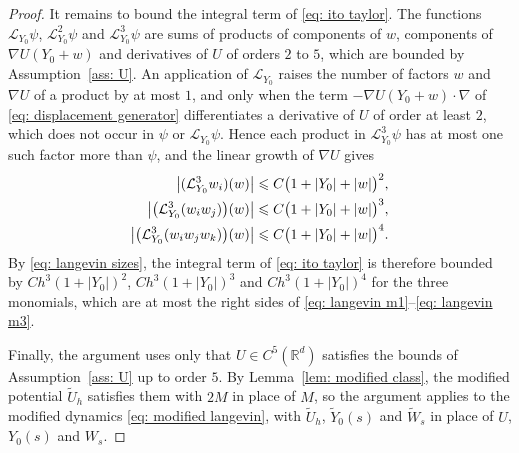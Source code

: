 \begin{proof}
    It remains to bound the integral term of \eqref{eq: ito taylor}. The functions $\mathcal L_{Y_0} \psi$, $\mathcal L_{Y_0}^2 \psi$ and $\mathcal L_{Y_0}^3 \psi$ are sums of products of components of $w$, components of $\nabla U(Y_0 + w)$ and derivatives of $U$ of orders $2$ to $5$, which are bounded by Assumption~\ref{ass: U}. An application of $\mathcal L_{Y_0}$ raises the number of factors $w$ and $\nabla U$ of a product by at most $1$, and only when the term $-\nabla U(Y_0 + w) \cdot \nabla$ of \eqref{eq: displacement generator} differentiates a derivative of $U$ of order at least $2$, which does not occur in $\psi$ or $\mathcal L_{Y_0} \psi$. Hence each product in $\mathcal L_{Y_0}^3 \psi$ has at most one such factor more than $\psi$, and the linear growth of $\nabla U$ gives
    \begin{equation*}
    \begin{aligned}
        \bigl| (\mathcal L_{Y_0}^3 w_i)(w) \bigr| &\leqslant C \bigl( 1 + |Y_0| + |w| \bigr)^{2} , \\
        \bigl| \bigl( \mathcal L_{Y_0}^3 (w_i w_j) \bigr)(w) \bigr| &\leqslant C \bigl( 1 + |Y_0| + |w| \bigr)^{3} , \\
        \bigl| \bigl( \mathcal L_{Y_0}^3 (w_i w_j w_k) \bigr)(w) \bigr| &\leqslant C \bigl( 1 + |Y_0| + |w| \bigr)^{4} .
    \end{aligned}
    \end{equation*}
    By \eqref{eq: langevin sizes}, the integral term of \eqref{eq: ito taylor} is therefore bounded by $C h^3 (1+|Y_0|)^{2}$, $C h^3 (1+|Y_0|)^{3}$ and $C h^3 (1+|Y_0|)^{4}$ for the three monomials, which are at most the right sides of \eqref{eq: langevin m1}--\eqref{eq: langevin m3}.

    Finally, the argument uses only that $U \in C^5(\mathbb R^d)$ satisfies the bounds of Assumption~\ref{ass: U} up to order $5$. By Lemma~\ref{lem: modified class}, the modified potential $\tilde U_h$ satisfies them with $2M$ in place of $M$, so the argument applies to the modified dynamics \eqref{eq: modified langevin}, with $\tilde U_h$, $\tilde Y_0(s)$ and $\tilde W_s$ in place of $U$, $Y_0(s)$ and $W_s$.
\end{proof}

